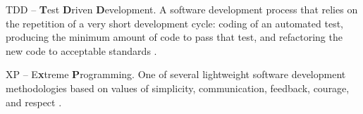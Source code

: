 \begin{list}{}{\setlength{}%
           \setlength\itemindent{-\leftmargin}%
           \let\makelabel\descriptionlabel}
\item[TDD] -- \textbf{T}est \textbf{D}riven \textbf{D}evelopment. A software development process that relies on the repetition of a very short development cycle: coding of an automated test, producing the minimum amount of code to pass that test, and refactoring the new code to acceptable standards \cite{Beck_TDD}.

\item[XP] -- E\textbf{x}treme \textbf{P}rogramming. One of several lightweight software development methodologies based on values of simplicity, communication, feedback, courage, and respect \cite{Beck_XP}.

\end{list}